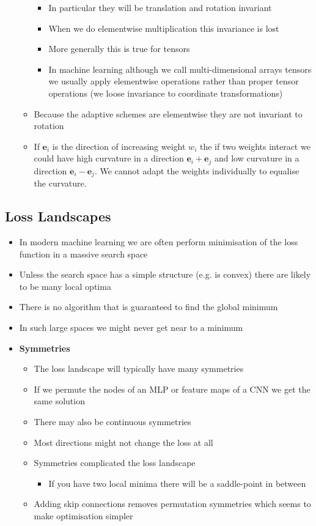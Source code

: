 \documentclass[11pt]{article}
\begin{document}
\begin{itemize}
\begin{itemize}
\begin{itemize}
\item In particular they will be translation and rotation invariant
\item When we do elementwise multiplication this invariance is lost
\item More generally this is true for tensors
\item In machine learning although we call multi-dimensional arrays
tensors we usually apply elementwise operations rather than
proper tensor operations (we loose invariance to coordinate
transformations)
\end{itemize}
\item Because the adaptive schemes are elementwise they are not
invariant to rotation
\item If \(\bm{e}_i\) is the direction of increasing weight \(w_i\) the
if two weights interact we could have high curvature in a
direction \(\bm{e}_i+\bm{e}_j\) and low curvature in a direction
\(\bm{e}_i-\bm{e}_j\).  We cannot adapt the weights individually
to equalise the curvature.
\end{itemize}
\end{itemize}

\subsection{Loss Landscapes}
\label{sec:orge00f646}
\begin{itemize}
\item In modern machine learning we are often perform minimisation of
the loss function in a massive search space
\item Unless the search space has a simple structure (e.g. is convex)
there are likely to be many local optima
\item There is no algorithm that is guaranteed to find the global minimum
\item In such large spaces we might never get near to a minimum
\item \textbf{Symmetries}
\begin{itemize}
\item The loss landscape will typically have many symmetries
\item If we permute the nodes of an MLP or feature maps of a CNN we
get the same solution
\item There may also be continuous symmetries
\item Most directions might not change the loss at all
\item Symmetries complicated the loss landscape
\begin{itemize}
\item If you have two local minima there will be a saddle-point in
between
\end{itemize}
\item Adding skip connections removes permutation symmetries which
seems to make optimisation simpler
\end{itemize}
\end{itemize}
\end{document}
